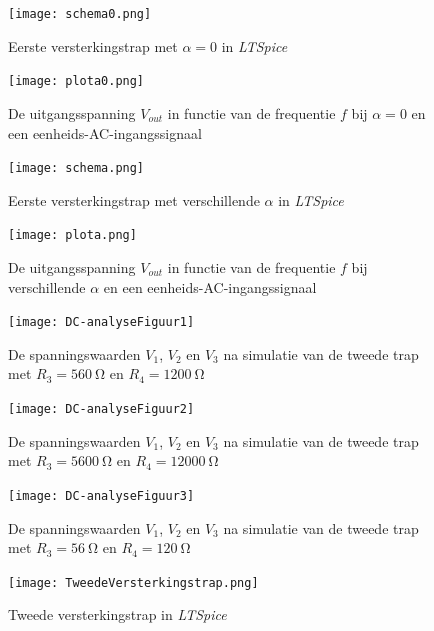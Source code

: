 \documentclass{report}
\begin{document}
\begin{appendices}
\begin{figure}[h]
	\centering
	\texttt{[image: schema0.png]}
	\caption{Eerste versterkingstrap met $\alpha = 0$ in \textit{LTSpice}}
	\label{schema0}
\end{figure}   

\begin{figure}[h]
	\centering
	\texttt{[image: plota0.png]}
	\caption{De uitgangsspanning $V_{out}$ in functie van de frequentie $f$ bij $\alpha = 0$ en een eenheids-AC-ingangssignaal}
	\label{plota0}
\end{figure} 

\begin{figure}[h]
	\centering
	\texttt{[image: schema.png]}
	\caption{Eerste versterkingstrap met verschillende $\alpha$ in \textit{LTSpice}}
	\label{schema}
\end{figure} 

\begin{figure}[h]
	\centering
	\texttt{[image: plota.png]}
	\caption{De uitgangsspanning $V_{out}$ in functie van de frequentie $f$ bij verschillende $\alpha$ en een eenheids-AC-ingangssignaal}
	\label{plota}
\end{figure} 

\begin{figure}[h]
	\centering
	\texttt{[image: DC-analyseFiguur1]}
	\caption{De spanningswaarden $V_1$, $V_2$ en $V_3$ na simulatie van de tweede trap met $R_3=\SI{560}{\ohm}$ en $R_4=\SI{1200}{\ohm}$}
	\label{DC-analyseFiguur1}
\end{figure}

\begin{figure}[h]
	\centering
	\texttt{[image: DC-analyseFiguur2]}
	\caption{De spanningswaarden $V_1$, $V_2$ en $V_3$ na simulatie van de tweede trap met $R_3=\SI{5600}{\ohm}$ en $R_4=\SI{12000}{\ohm}$}
	\label{DC-analyseFiguur2}
\end{figure}

\begin{figure}[h]
	\centering
	\texttt{[image: DC-analyseFiguur3]}
	\caption{De spanningswaarden $V_1$, $V_2$ en $V_3$ na simulatie van de tweede trap met $R_3=\SI{56}{\ohm}$ en $R_4=\SI{120}{\ohm}$}
	\label{DC-analyseFiguur3}
\end{figure}

\begin{figure}[h]
	\centering
	\texttt{[image: TweedeVersterkingstrap.png]}
	\caption{Tweede versterkingstrap in \textit{LTSpice}}
	\label{SPICE2}
\end{figure}


\end{appendices}
\end{document}
